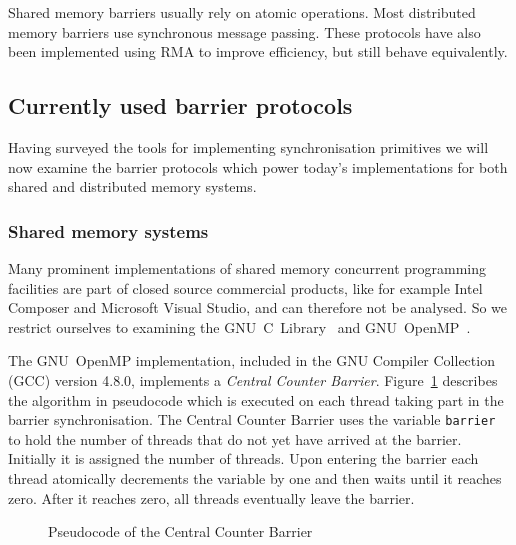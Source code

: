 \documentclass[a4paper, 10pt]{article}
\begin{document}
Shared memory barriers usually rely on atomic operations. Most distributed memory barriers use synchronous message passing. These protocols have also been implemented using RMA to improve efficiency, but still behave equivalently.

\subsection{Currently used barrier protocols}
\label{ssec:background-currently-used}
Having surveyed the tools for implementing synchronisation primitives we will now examine the barrier protocols which power today's implementations for both shared and distributed memory systems.

\subsubsection{Shared memory systems}
\label{sssec:background-currently-used-shared}

Many prominent implementations of shared memory concurrent programming facilities are part of closed source commercial products, like for example Intel Composer and Microsoft Visual Studio, and can therefore not be analysed. So we restrict ourselves to examining the GNU~C~Library~\cite{glibc} and GNU~OpenMP~\cite{gomp}.

The GNU~OpenMP implementation, included in the GNU Compiler Collection (GCC) version 4.8.0, implements a \emph{Central Counter Barrier}. Figure~\ref{fig:pseudocode-central-counter} describes the algorithm in pseudocode which is executed on each thread taking part in the barrier synchronisation.
The Central Counter Barrier uses the variable \texttt{barrier} to hold the number of threads that do not yet have arrived at the barrier. Initially it is assigned the number of threads. Upon entering the barrier each thread atomically decrements the variable by one and then waits until it reaches zero. After it reaches zero, all threads eventually leave the barrier.

\begin{figure}[H]
	\centering
	
	\caption{Pseudocode of the Central Counter Barrier}
	\label{fig:pseudocode-central-counter}
\end{figure}
\end{document}
